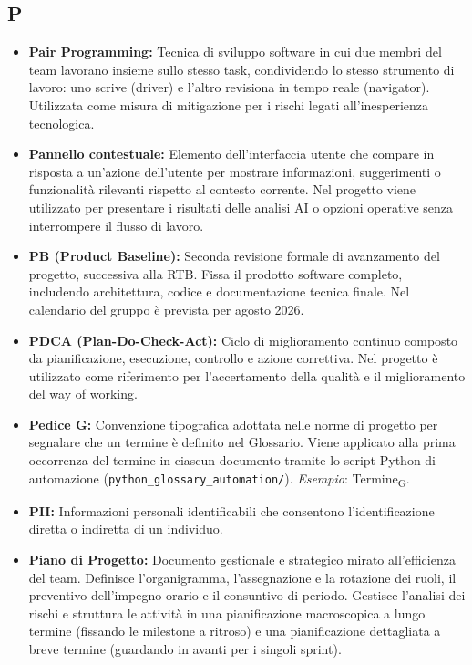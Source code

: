 \subsection*{P}
\begin{itemize}[leftmargin=*]
      \item \textbf{Pair Programming:} Tecnica di sviluppo software in cui due membri del
      team lavorano insieme sullo stesso task, condividendo lo stesso
      strumento di lavoro: uno scrive (driver) e l'altro revisiona in tempo reale
      (navigator). Utilizzata come misura di mitigazione per i rischi legati
      all'inesperienza tecnologica.
      \item \textbf{Pannello contestuale:} Elemento dell'interfaccia utente che compare in risposta a un'azione dell'utente per mostrare informazioni, suggerimenti o funzionalità rilevanti rispetto al contesto corrente. Nel progetto viene utilizzato per presentare i risultati delle analisi AI o opzioni operative senza interrompere il flusso di lavoro.
      \item \textbf{PB (Product Baseline):} Seconda revisione formale di avanzamento
      del progetto, successiva alla RTB. Fissa il prodotto software completo,
      includendo architettura, codice e documentazione tecnica finale. Nel
      calendario del gruppo è prevista per agosto 2026.
      \item \textbf{PDCA (Plan-Do-Check-Act):} Ciclo di miglioramento continuo composto da pianificazione, esecuzione, controllo e azione correttiva. Nel progetto è utilizzato come riferimento per l'accertamento della qualità e il miglioramento del way of working.
      \item \textbf{Pedice G:} Convenzione tipografica adottata nelle norme di progetto
          per segnalare che un termine è definito nel Glossario. Viene applicato
          alla prima occorrenza del termine in ciascun documento tramite lo script
          Python di automazione (\texttt{python\_glossary\_automation/}).
          \textit{Esempio}: Termine\textsubscript{G}.
      \item \textbf{PII:} Informazioni personali identificabili che consentono l’identificazione diretta o indiretta di un individuo.
      \item \textbf{Piano di Progetto:} Documento gestionale e strategico mirato all'efficienza del team. Definisce l'organigramma, l'assegnazione e la rotazione dei ruoli, il preventivo dell'impegno orario e il consuntivo di periodo. Gestisce l'analisi dei rischi e struttura le attività in una pianificazione macroscopica a lungo termine (fissando le milestone a ritroso) e una pianificazione dettagliata a breve termine (guardando in avanti per i singoli sprint).

\end{itemize}

